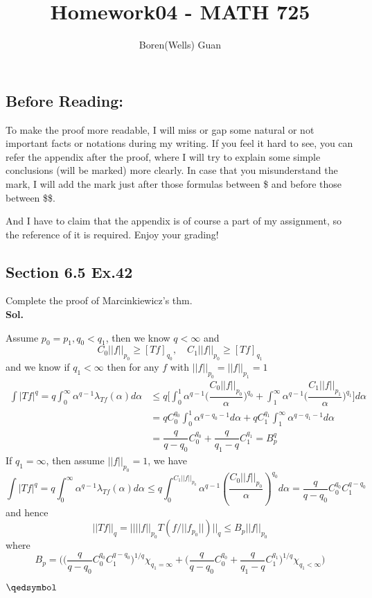 \documentclass[lang=en,11pt,a4paper,citestyle =authoryear]{elegantpaper}
\title{Homework04 - MATH 725}
\author{Boren(Wells) Guan}
\newcommand{\prvd}{$\hfill \qedsymbol$}
\newcommand{\dstrb}[1]{\lambda_{#1}}
\begin{document}
\maketitle

\subsection*{Before Reading:}\par
To make the proof more readable, I will miss or gap some natural or not important facts or notations during my writing. If you feel it hard to see, you can refer the appendix after the proof, where I will try to explain some simple conclusions (will be marked) more clearly. In case that you misunderstand the mark, I will add the mark just after those formulas between \$ and before those between \$\$.\par
And I have to claim that the appendix is of course a part of my assignment, so the reference of it is required. Enjoy your grading!


\subsection*{Section 6.5 Ex.42} 
Complete the proof of Marcinkiewicz's thm.
\vspace{0.5em}\\
\textbf{Sol.} \par
Assume $p_0 = p_1,q_0 < q_1$, then we know $q<\infty$ and
    \[C_0||f||_{p_0} \geq [Tf]_{q_0},\quad C_1||f||_{p_0}\geq [Tf]_{q_1}\]
    and we know if $q_1 < \infty$ then for any $f$ with $||f||_{p_0} = ||f||_{p_1} = 1$
    \[
    \begin{aligned}
    \int |Tf|^q = q\int_0^{\infty} \alpha^{q-1}\dstrb{Tf}(\alpha)d\alpha &\leq q\Big[\int_0^1 \alpha^{q-1}\Big(\dfrac{C_0||f||_{p_0}}{\alpha})^{q_0}+\int_1^{\infty} \alpha^{q-1}\Big(\dfrac{C_1||f||_{p_1}}{\alpha})^{q_1}\Big] d\alpha\\
    &= qC_0^{q_0} \int_0^1 \alpha^{q-q_0-1}d\alpha + qC_1^{q_1} \int_1^{\infty} \alpha^{q-q_1-1}d\alpha \\
    & = \dfrac{q}{q-q_0}C_0^{q_0} + \dfrac{q}{q_1-q}C_1^{q_1} = B_p^{q}
    \end{aligned}
    \]
    If $q_1 = \infty$, then assume $||f||_{p_0} = 1$, we have
    \[
        \int |Tf|^q = q\int_0^{\infty} \alpha^{q-1}\dstrb{Tf}(\alpha)d\alpha \leq q\int_0^{C_1||f||_{p_0}} \alpha^{q-1}(\dfrac{C_0||f||_{p_0}}{\alpha})^{q_0}d\alpha = \dfrac{q}{q-q_0}C_0^{q_0}C_1^{q-q_0}
    \]
    and hence
    \[
    ||Tf||_q = ||||f||_{p_0} T(f/||f_{p_0}||)||_q \leq  B_p||f||_{p_0}
    \]
    where
    \[B_p = \Big(\Big(\dfrac{q}{q-q_0}C_0^{q_0}C_1^{q-q_0}\Big)^{1/q}\chi_{q_1 = \infty} +  \Big(\dfrac{q}{q-q_0}C_0^{q_0} + \dfrac{q}{q_1-q}C_1^{q_1}\Big)^{1/q}\chi_{q_1 < \infty}\Big)\]
\par
\prvd
\vspace{0.5em}
\end{document}
